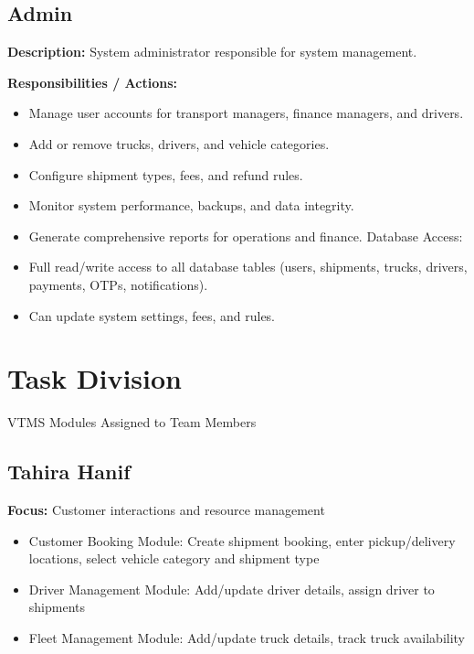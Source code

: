 \documentclass[12pt,a4paper]{article}
\begin{document}
\subsection{Admin}

\textbf{Description:} System administrator responsible for system management.

\textbf{Responsibilities / Actions:}

\begin{itemize}
\item Manage user accounts for transport managers, finance managers, and drivers.
\item Add or remove trucks, drivers, and vehicle categories.
\item Configure shipment types, fees, and refund rules.
\item Monitor system performance, backups, and data integrity.
\item Generate comprehensive reports for operations and finance.
Database Access:
\item Full read/write access to all database tables (users, shipments, trucks, drivers, payments, OTPs, notifications).
\item Can update system settings, fees, and rules.

\end{itemize}

\section{Task Division}

VTMS Modules Assigned to Team Members

\subsection{Tahira Hanif}
\textbf{Focus:} Customer interactions and resource management
\begin{itemize}
    \item Customer Booking Module: Create shipment booking, enter pickup/delivery locations, select vehicle category and shipment type
\item  Driver Management Module: Add/update driver details, assign driver to shipments
\item  Fleet Management Module: Add/update truck details, track truck availability

\end{itemize}
\end{document}
